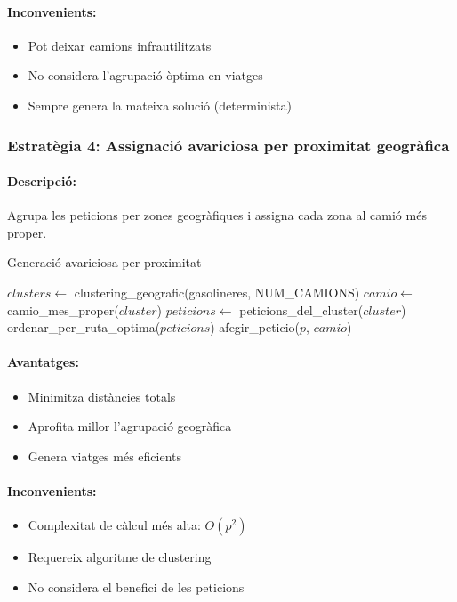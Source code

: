 \paragraph{Inconvenients:}
\begin{itemize}
    \item Pot deixar camions infrautilitzats
    \item No considera l'agrupació òptima en viatges
    \item Sempre genera la mateixa solució (determinista)
\end{itemize}

\subsubsection{Estratègia 4: Assignació avariciosa per proximitat geogràfica}

\paragraph{Descripció:}
Agrupa les peticions per zones geogràfiques i assigna cada zona al camió més proper.

\begin{algorithm}[H]
\caption{Generació avariciosa per proximitat}
\begin{algorithmic}[1]
\State $clusters \gets$ clustering\_geografic(gasolineres, NUM\_CAMIONS)
    \State $camio \gets$ camio\_mes\_proper($cluster$)
    \State $peticions \gets$ peticions\_del\_cluster($cluster$)
    \State ordenar\_per\_ruta\_optima($peticions$)
            \State afegir\_peticio($p$, $camio$)
        \EndIf
    \EndFor
\EndFor
\end{algorithmic}
\end{algorithm}

\paragraph{Avantatges:}
\begin{itemize}
    \item Minimitza distàncies totals
    \item Aprofita millor l'agrupació geogràfica
    \item Genera viatges més eficients
\end{itemize}

\paragraph{Inconvenients:}
\begin{itemize}
    \item Complexitat de càlcul més alta: $O(p^2)$
    \item Requereix algoritme de clustering
    \item No considera el benefici de les peticions
\end{itemize}

